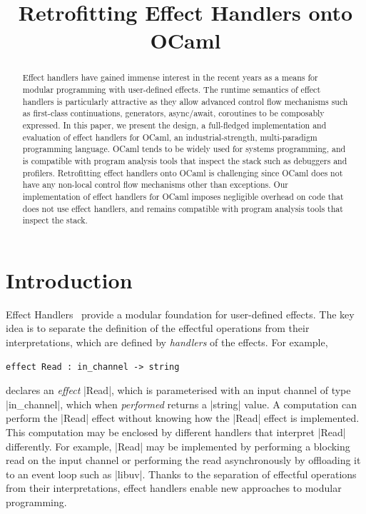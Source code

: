 \documentclass[sigplan,10pt,review,anonymous]{acmart}\settopmatter{printfolios=true,printccs=false,printacmref=false}
\begin{document}
\title{Retrofitting Effect Handlers onto OCaml}

\begin{abstract}
  Effect handlers have gained immense interest in the recent years as a means
  for modular programming with user-defined effects. The runtime semantics of
  effect handlers is particularly attractive as they allow advanced control
  flow mechanisms such as first-class continuations, generators, async/await,
  coroutines to be composably expressed. In this paper, we present the design,
  a full-fledged implementation and evaluation of effect handlers for OCaml, an
  industrial-strength, multi-paradigm programming language. OCaml tends to be
  widely used for systems programming, and is compatible with program analysis
  tools that inspect the stack such as debuggers and profilers. Retrofitting
  effect handlers onto OCaml is challenging since OCaml does not have any
  non-local control flow mechanisms other than exceptions. Our implementation
  of effect handlers for OCaml imposes negligible overhead on code that does
  not use effect handlers, and remains compatible with program analysis tools
  that inspect the stack.
\end{abstract}

\maketitle

\section{Introduction}

Effect Handlers~\cite{Plotkin09} provide a modular foundation for user-defined
effects. The key idea is to separate the definition of the effectful operations
from their interpretations, which are defined by \emph{handlers} of the
effects. For example,
%
\begin{lstlisting}
effect Read : in_channel -> string
\end{lstlisting}
%
declares an \emph{effect} |Read|, which is parameterised with an input channel
of type |in_channel|, which when \emph{performed} returns a |string| value. A
computation can perform the |Read| effect without knowing how the |Read| effect
is implemented. This computation may be enclosed by different handlers that
interpret |Read| differently. For example, |Read| may be implemented by
performing a blocking read on the input channel or performing the read
asynchronously by offloading it to an event loop such as |libuv|. Thanks to the
separation of effectful operations from their interpretations, effect handlers
enable new approaches to modular programming.
\end{document}
